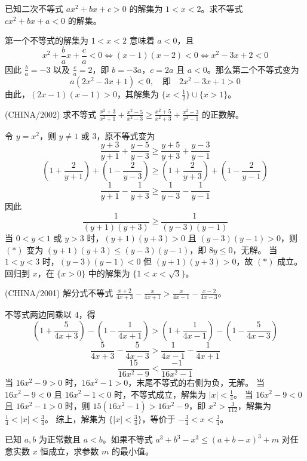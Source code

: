 \begin{questions}
\question 已知二次不等式 $ax^2+bx+c>0$ 的解集为 $1<x<2$。求不等式 $cx^2+bx+a<0$ 的解集。

\begin{solution}
第一个不等式的解集为 $1<x<2$ 意味着 $a<0$，且
\[
x^2+\frac{b}{a}x+\frac{c}{a}<0 \iff (x-1)(x-2)<0 \iff x^2-3x+2<0
\]
因此 $\frac{b}{a}=-3$ 以及 $\frac{c}{a}=2$，即 $b=-3a$，$c=2a$ 且 $a<0$。那么第二个不等式变为
\[
a(2x^2-3x+1)<0, \quad \text{即} \quad 2x^2-3x+1>0
\]
由此，$(2x-1)(x-1)>0$，其解集为 $\{x<\frac{1}{2}\} \cup \{x>1\}$。
\end{solution}

\question (CHINA/2002) 求不等式 $\frac{x^2+3}{x^2+1} + \frac{x^2-5}{x^2-3} \ge \frac{x^2+5}{x^2+3} + \frac{x^2-3}{x^2-1}$ 的正数解。

\begin{solution}
令 $y=x^2$，则 $y \neq 1$ 或 $3$，原不等式变为
\[
\frac{y+3}{y+1} + \frac{y-5}{y-3} \ge \frac{y+5}{y+3} + \frac{y-3}{y-1}
\]
\[
\left(1+\frac{2}{y+1}\right) + \left(1-\frac{2}{y-3}\right) \ge \left(1+\frac{2}{y+3}\right) + \left(1-\frac{2}{y-1}\right)
\]
\[
\frac{1}{y+1} - \frac{1}{y+3} \ge \frac{1}{y-3} - \frac{1}{y-1}
\]
因此
\[
\frac{1}{(y+1)(y+3)} \ge \frac{1}{(y-3)(y-1)} \tag{*}
\]
当 $0<y<1$ 或 $y>3$ 时，$(y+1)(y+3)>0$ 且 $(y-3)(y-1)>0$，则 $(*)$ 变为 $(y+1)(y+3) \le (y-3)(y-1)$，即 $8y \le 0$，无解。
当 $1<y<3$ 时，$(y-3)(y-1)<0$ 但 $(y+1)(y+3)>0$，故 $(*)$ 成立。
回归到 $x$，在 $\{x>0\}$ 中的解集为 $\{1 < x < \sqrt{3}\}$。
\end{solution}

\question (CHINA/2001) 解分式不等式 $\frac{x+2}{4x+3} - \frac{x}{4x+1} > \frac{x}{4x-1} - \frac{x-2}{4x-3}$。

\begin{solution}
不等式两边同乘以 $4$，得
\[
\left(1+\frac{5}{4x+3}\right) - \left(1-\frac{1}{4x+1}\right) > \left(1+\frac{1}{4x-1}\right) - \left(1-\frac{5}{4x-3}\right)
\]
\[
\frac{5}{4x+3} - \frac{5}{4x-3} > \frac{1}{4x-1} - \frac{1}{4x+1}
\]
\[
\frac{15}{16x^2-9} < \frac{-1}{16x^2-1}
\]
当 $16x^2-9>0$ 时，$16x^2-1>0$，末尾不等式的右侧为负，无解。
当 $16x^2-9<0$ 且 $16x^2-1<0$ 时，不等式成立，解集为 $|x|<\frac{1}{4}$。
当 $16x^2-9<0$ 且 $16x^2-1>0$ 时，则 $15(16x^2-1) > 16x^2-9$，即 $x^2 > \frac{3}{112}$，解集为 $\frac{1}{4} < |x| < \frac{3}{4}$。
综上，解集为 $\{|x| < \frac{3}{4}\}$，等价于 $-\frac{3}{4} < x < \frac{3}{4}$。
\end{solution}

\question 已知 $a, b$ 为正常数且 $a<b$。如果不等式 $a^3+b^3-x^3 \le (a+b-x)^3 + m$ 对任意实数 $x$ 恒成立，求参数 $m$ 的最小值。


\end{questions}
